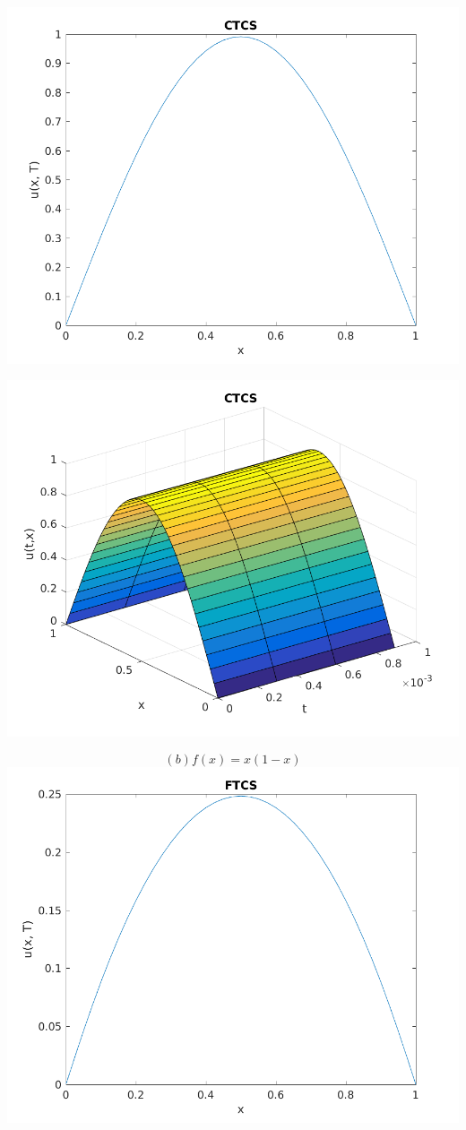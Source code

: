 \documentclass{article}
\begin{document}
\includegraphics{"q2_5"}
\pagebreak

\includegraphics{"q2_6"}
\pagebreak

\[(b) f (x) = x (1 - x)\]
\includegraphics{"q2_7"}
\pagebreak
\end{document}
